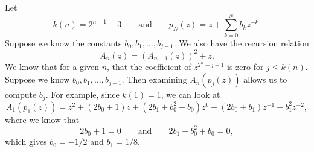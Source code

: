 \documentclass[12pt, letterpaper]{article}
\begin{document}
\setlength{\fboxsep}{10pt}
\noindent
Let
\begin{equation*}
    k(n) = 2^{n+1}-3
    \qquad\textrm{and}\qquad
    p_{N}(z) = z + \sum_{k=0}^{N}b_{k}z^{-k}.
\end{equation*}
Suppose we know the constants $b_{0}, b_{1}, \ldots, b_{j-1}$.
We also have the recursion relation
\begin{equation*}
    A_{n}(z) = (A_{n-1}(z))^{2} + z.
\end{equation*}
We know that for a given $n$, that the coefficient of
$z^{2^{n}-j-1}$ is zero for $j \leq k(n)$.
Suppose we know $b_{0}, b_{1}, \ldots, b_{j-1}$.
Then examining $A_{n}(p_{j}(z))$ allows us to compute $b_{j}.$
For example, since $k(1) = 1$, we can look at
\begin{equation*}
    A_{1}(p_{1}(z))
    = z^{2} + (2b_{0}+1)z + (2b_{1} + b_{0}^{2} + b_{0})z^{0} + (2b_{0}+b_{1})z^{-1} + b_{1}^{2}z^{-2},
\end{equation*}
where we know that
\begin{equation*}
    2b_{0}+1 = 0
    \qquad\textrm{and}\qquad
    2b_{1} + b_{0}^{2} + b_{0} = 0,
\end{equation*}
which gives $b_{0} = -1/2$ and $b_{1} = 1/8$.
\end{document}
